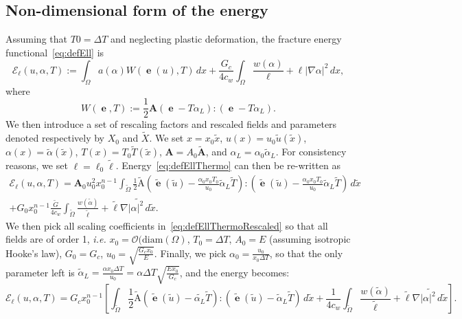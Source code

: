 \documentclass[10pt,oneside]{report}
\DeclareMathOperator{\e}{{\mathbf e}}
\begin{document}
\subsection{Non-dimensional form of the energy}
Assuming that $T0 = \Delta T$ and neglecting plastic deformation, the fracture energy functional~\eqref{eq:defEll} is
\begin{equation}
	\label{eq:defEllThermo}
	\mathcal{E}_\ell(u,\alpha,T) := \int_\Omega a(\alpha) W(\e(u),T)\, dx +  \frac{G_c}{4c_w} \int_\Omega \frac{w(\alpha)}{\ell} + \ell|\nabla \alpha|^2\, dx,
\end{equation}
where 
$$
W(\e,T) := \frac{1}{2} \mathbf{A}\left(\e-T \alpha_L\right):\left(\e-T \alpha_L\right).
$$
We then introduce a set of rescaling factors and rescaled fields and parameters denoted respectively by $X_0$ and $\tilde{X}$. 
We set $x = x_0 \tilde{x}$, $u (x)= u_0 \tilde{u}(\tilde{x})$, $\alpha(x) = \tilde{\alpha}(\tilde{x})$, $T(x) = T_0 \tilde{T}(\tilde{x})$, $\mathbf{A} = A_0 \tilde{\mathbf{A}}$, and $\alpha_L = \alpha_0 \tilde{\alpha}_L$. 
For consistency reasons, we set $\ell = \ell_0 \tilde{\ell}$. Energy~\eqref{eq:defEllThermo} can then be re-written as
\begin{multline}
\mathcal{E}_\ell(u,\alpha,T) = \mathbf{A}_0 u_0^2x_0^{n-1}\int_{\tilde{\Omega}} \frac{1}{2}\tilde{\mathrm{A}} \left(\tilde{\e}(\tilde{u}) - \frac{\alpha_0x_0T_0}{u_0}\tilde{\alpha}_L\tilde{T}\right):\left(\tilde{\e}(\tilde{u}) - \frac{\alpha_0x_0T_0}{u_0}\tilde{\alpha}_L\tilde{T}\right)\, d\tilde{x} \\
+G_0x_0^{n-1}\frac{\tilde{G}}{4c_w} \int_{\tilde{\Omega}} \frac{w(\tilde{\alpha})}{\tilde{\ell}} + \tilde{\ell} \tilde{\nabla |\alpha|^2\, d\tilde{x}}.
\label{eq:defEllThermoRescaled}
\end{multline}
We then pick all scaling coefficients in~\eqref{eq:defEllThermoRescaled} so that all fields are of order 1, \emph{i.e.} $x_0 = \mathcal{O}(\mathrm{diam}(\Omega)$, $T_0 = \Delta T$, $A_0 = E$ (assuming isotropic Hooke's law), $G_0 = G_c$, $u_0 = \sqrt{\frac{G_cx_0}{E}}$. Finally, we pick $\alpha_0=\frac{u_0}{x_0\Delta T}$, so that the only parameter left is $\tilde{\alpha}_L = \frac{\alpha x_0 \Delta T}{u_0} = \alpha \Delta T\sqrt{\frac{E x_0}{G_c}}$, and the energy becomes:
\begin{equation}
\mathcal{E}_\ell(u,\alpha,T) = G_c x_0^{n-1}\left[\int_{\tilde{\Omega}} \frac{1}{2}\tilde{\mathrm{A}} \left(\tilde{\e}(\tilde{u}) - \tilde{\alpha_L}\tilde{T}\right):\left(\tilde{\e}(\tilde{u}) - \tilde{\alpha}_L\tilde{T}\right)\, d\tilde{x} 
+\frac{1}{4c_w} \int_{\tilde{\Omega}} \frac{w(\tilde{\alpha})}{\tilde{\ell}} + \tilde{\ell} \tilde{\nabla |\alpha|^2\, d\tilde{x}}\right].
\label{eq:defEllThermoRescaled2}
\end{equation}
\end{document}
